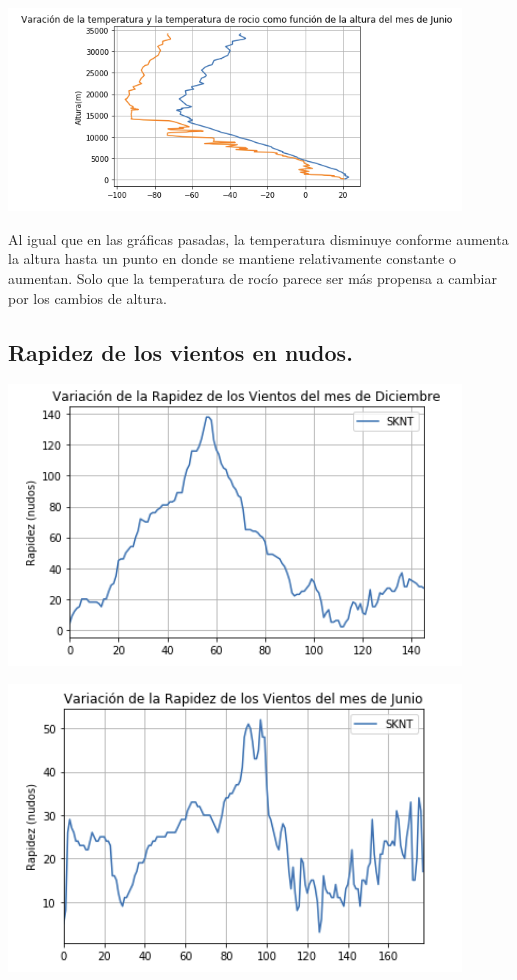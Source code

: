 \documentclass{article}
\begin{document}
\begin{center}
	\includegraphics[width=12cm]{graph3J.png}
\end{center}
\vspace{0.3cm}

Al igual que en las gráficas pasadas, la temperatura disminuye conforme aumenta la altura hasta un punto en donde se mantiene relativamente constante o aumentan. Solo que la temperatura de rocío parece ser más propensa a cambiar por los cambios de altura.


\subsection{Rapidez de los vientos en nudos.}

\begin{center}
	\includegraphics[width=12cm]{graph4D.png}
\end{center}

\begin{center}
	\includegraphics[width=12cm]{graph4J.png}
\end{center}
\vspace{0.3cm}
\end{document}
